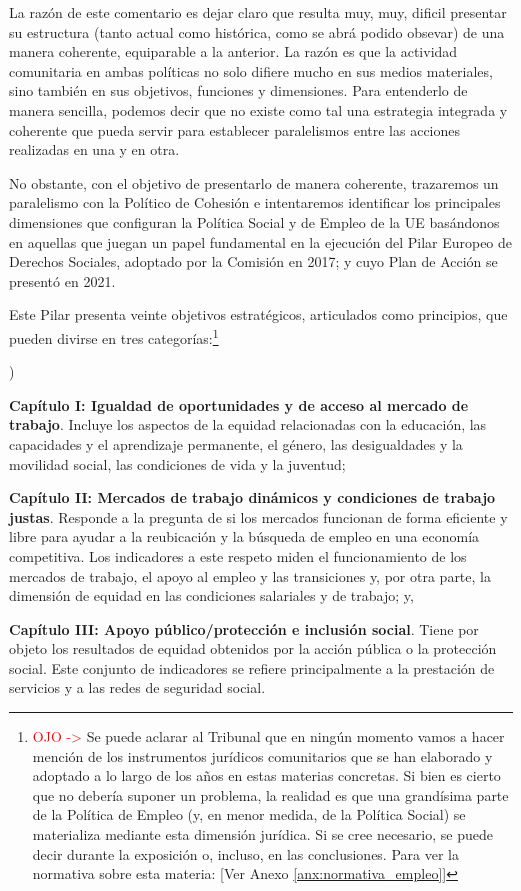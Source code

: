 \documentclass[10pt,a4paper]{article}
\newcounter{alphaitem}
\newenvironment{la}
      {\begin{list}{\alph{alphaitem})}{%
          \usecounter{alphaitem}%
          \setlength{\leftmargin}{1cm}%
          \setlength{\parskip}{3pt}%
          \setlength{\itemsep}{0pt}%
          \setlength{\parsep}{0pt}%
      }}
      {\end{list}}
\newcommand{\authorfont}[1]{{\fontfamily{EBGaramond-TLF}\selectfont #1}}
\begin{document}
La razón de este comentario es dejar claro que resulta muy, muy, dificil presentar su estructura (tanto actual como histórica, como se abrá podido obsevar) de una manera coherente, equiparable a la anterior. La razón es que la actividad comunitaria en ambas políticas no solo difiere mucho en sus medios materiales, sino también en sus objetivos, funciones y dimensiones. Para entenderlo de manera sencilla, podemos decir que no existe como tal una estrategia integrada y coherente que pueda servir para establecer paralelismos entre las acciones realizadas en una y en otra. 

No obstante, con el objetivo de presentarlo de manera coherente, trazaremos un paralelismo con la Político de Cohesión e intentaremos identificar los principales dimensiones que configuran la Política Social y de Empleo de la UE basándonos en aquellas que juegan un papel fundamental en la ejecución del Pilar Europeo de Derechos Sociales, adoptado por la Comisión en 2017; y cuyo Plan de Acción se presentó en 2021.

Este Pilar presenta veinte objetivos estratégicos, articulados como principios, que pueden divirse en tres categorías:\footnote{%
    \textcolor{red}{OJO ->} Se puede aclarar al Tribunal que en ningún momento vamos a hacer mención de los instrumentos jurídicos comunitarios que se han elaborado y adoptado a lo largo de los años en estas materias concretas. Si bien es cierto que no debería suponer un problema, la realidad es que una grandísima parte de la Política de Empleo (y, en menor medida, de la Política Social) se materializa mediante esta dimensión jurídica. Si se cree necesario, se puede decir durante la exposición o, incluso, en las conclusiones. Para ver la normativa sobre esta materia: [\authorfont{Ver Anexo \ref{anx:normativa_empleo}}]
}
\begin{la}
    \item \textbf{Capítulo I: Igualdad de oportunidades y de acceso al mercado de trabajo}. Incluye los aspectos de la equidad relacionadas con la educación, las capacidades y el aprendizaje permanente, el género, las desigualdades y la movilidad social, las condiciones de vida y la juventud;
    \item \textbf{Capítulo II: Mercados de trabajo dinámicos y condiciones de trabajo justas}. Responde a la pregunta de si los mercados funcionan de forma eficiente y libre para ayudar a la reubicación y la búsqueda de empleo en una economía competitiva. Los indicadores a este respeto miden el funcionamiento de los mercados de trabajo, el apoyo al empleo y las transiciones y, por otra parte, la dimensión de equidad en las condiciones salariales y de trabajo; y,
    \item \textbf{Capítulo III: Apoyo público/protección e inclusión social}. Tiene por objeto los resultados de equidad obtenidos por la acción pública o la protección social. Este conjunto de indicadores se refiere principalmente a la prestación de servicios y a las redes de seguridad social.
\end{la}  
\end{document}
